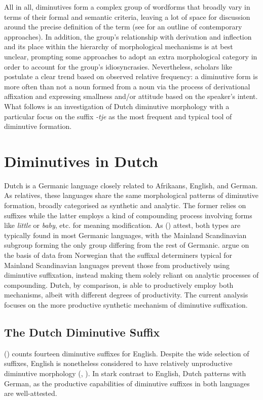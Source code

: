 All in all, diminutives form a complex group of wordforms that broadly vary in terms of their formal and semantic criteria, leaving a lot of space for discussion around the precise definition of the term (see \cite{Schneider+2003} for an outline of contemporary approaches). In addition, the group's relationship with derivation and inflection and its place within the hierarchy of morphological mechanisms is at best unclear, prompting some approaches to adopt an extra morphological category in order to account for the group's idiosyncrasies. Nevertheless, scholars like \citeauthor{Schneider+2003} postulate a clear trend based on observed relative frequency: a diminutive form is more often than not a noun formed from a noun via the process of derivational affixation and expressing smallness and/or attitude based on the speaker's intent. What follows is an investigation of Dutch diminutive morphology with a particular focus on the suffix \textit{-tje} as the most frequent and typical tool of diminutive formation.
 
\section{Diminutives in Dutch}
\label{sec:dutchdimsuffix}
Dutch is a Germanic language closely related to Afrikaans, English, and German. As relatives, these languages share the same morphological patterns of diminutive formation, broadly categorised as synthetic and analytic. The former relies on suffixes while the latter employs a kind of compounding process involving forms like \textit{little} or \textit{baby}, etc. for meaning modification. As \citeauthor{Alexiadou+Lohndal} (\citeyear{Alexiadou+Lohndal}) attest, both types are typically found in most Germanic languages, with the Mainland Scandinavian subgroup forming the only group differing from the rest of Germanic. \citeauthor{Alexiadou+Lohndal} argue on the basis of data from Norwegian that the suffixal determiners typical for Mainland Scandinavian languages prevent those from productively using diminutive suffixation, instead making them solely reliant on analytic processes of compounding. Dutch, by comparison, is able to productively employ both mechanisms, albeit with different degrees of productivity. The current analysis focuses on the more productive synthetic mechanism of diminutive suffixation.

\subsection{The Dutch Diminutive Suffix}
\citeauthor{Schneider+2003} (\citeyear{Schneider+2003}) counts fourteen diminutive suffixes for English. Despite the wide selection of suffixes, English is nonetheless considered to have relatively unproductive diminutive morphology (\citeauthor{Alexiadou+Lohndal}, \citeyear{Alexiadou+Lohndal}). In stark contrast to English, Dutch patterns with German, as the productive capabilities of diminutive suffixes in both languages are well-attested. 

